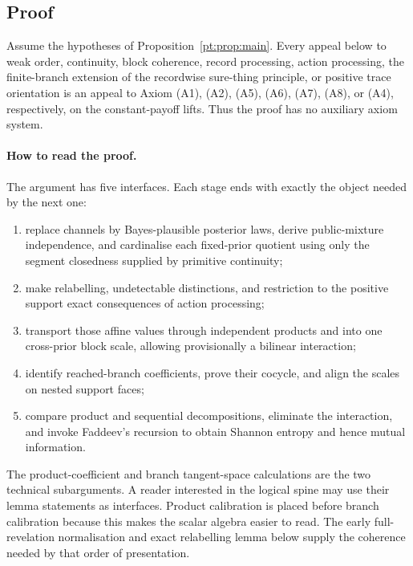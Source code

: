 \subsection{Proof}

Assume the hypotheses of Proposition~\ref{pt:prop:main}.  Every appeal below
to weak order, continuity, block coherence, record processing, action
processing, the finite-branch extension of the recordwise sure-thing principle, or positive trace orientation is an
appeal to Axiom \textup{(A1)}, \textup{(A2)}, \textup{(A5)}, \textup{(A6)},
\textup{(A7)}, \textup{(A8)}, or \textup{(A4)}, respectively, on the
constant-payoff lifts.  Thus the proof has no auxiliary axiom system.

\paragraph{How to read the proof.}
The argument has five interfaces.  Each stage ends with exactly the object
needed by the next one:
\begin{enumerate}[label=\textup{Stage \arabic*:},leftmargin=*]
\item replace channels by Bayes-plausible posterior laws, derive public-mixture
  independence, and cardinalise each fixed-prior quotient using only the
  segment closedness supplied by primitive continuity;
\item make relabelling, undetectable distinctions, and restriction to the
  positive support exact consequences of action processing;
\item transport those affine values through independent products and into one
  cross-prior block scale, allowing provisionally a bilinear interaction;
\item identify reached-branch coefficients, prove their cocycle, and align
  the scales on nested support faces;
\item compare product and sequential decompositions, eliminate the
  interaction, and invoke Faddeev's recursion to obtain Shannon entropy and
  hence mutual information.
\end{enumerate}
The product-coefficient and branch tangent-space calculations are the two
technical subarguments.  A reader interested in the logical spine may use
their lemma statements as interfaces.  Product calibration is
placed before branch calibration because this makes the scalar algebra easier
to read.  The early full-revelation normalisation and exact relabelling lemma
below supply the coherence needed by that order of presentation.

